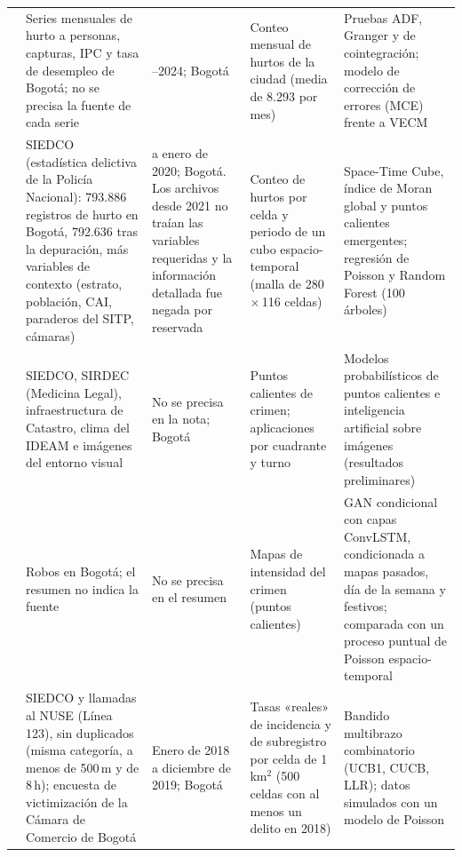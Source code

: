 \documentclass[12pt,letterpaper]{article}
\begin{document}
{\begin{longtable}{@{}>{\raggedright\arraybackslash}p{2.2cm}>{\raggedright\arraybackslash}p{4.0cm}>{\raggedright\arraybackslash}p{2.4cm}>{\raggedright\arraybackslash}p{2.9cm}>{\raggedright\arraybackslash}p{3.0cm}@{}}
\addlinespace
\citet{garzon2025} & Series mensuales de hurto a personas, capturas, IPC y tasa de desempleo de Bogotá; no se precisa la fuente de cada serie & 2015--2024; Bogotá & Conteo mensual de hurtos de la ciudad (media de 8.293 por mes) & Pruebas ADF, Granger y de cointegración; modelo de corrección de errores (MCE) frente a VECM \\
\addlinespace
\citet{martinez2025} & SIEDCO (estadística delictiva de la Policía Nacional): 793.886 registros de hurto en Bogotá, 792.636 tras la depuración, más variables de contexto (estrato, población, CAI, paraderos del SITP, cámaras) & 2010 a enero de 2020; Bogotá. Los archivos desde 2021 no traían las variables requeridas y la información detallada fue negada por reservada & Conteo de hurtos por celda y periodo de un cubo espacio-temporal (malla de 280\,$\times$\,116 celdas) & Space-Time Cube, índice de Moran global y puntos calientes emergentes; regresión de Poisson y Random Forest (100 árboles) \\
\addlinespace
\citet{riascos2020} & SIEDCO, SIRDEC (Medicina Legal), infraestructura de Catastro, clima del IDEAM e imágenes del entorno visual & No se precisa en la nota; Bogotá & Puntos calientes de crimen; aplicaciones por cuadrante y turno & Modelos probabilísticos de puntos calientes e inteligencia artificial sobre imágenes (resultados preliminares) \\
\addlinespace
\citet{urcuqui2020} & Robos en Bogotá; el resumen no indica la fuente & No se precisa en el resumen & Mapas de intensidad del crimen (puntos calientes) & GAN condicional con capas ConvLSTM, condicionada a mapas pasados, día de la semana y festivos; comparada con un proceso puntual de Poisson espacio-temporal \\
\addlinespace
\citet{riascos2023} & SIEDCO y llamadas al NUSE (Línea 123), sin duplicados (misma categoría, a menos de 500\,m y de 8\,h); encuesta de victimización de la Cámara de Comercio de Bogotá & Enero de 2018 a diciembre de 2019; Bogotá & Tasas «reales» de incidencia y de subregistro por celda de 1\,km$^2$ (500 celdas con al menos un delito en 2018) & Bandido multibrazo combinatorio (UCB1, CUCB, LLR); datos simulados con un modelo de Poisson \\
\end{longtable}

}
\end{document}
